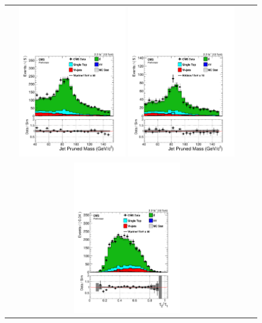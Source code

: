  \begin{figure}[htbp]
 \centering
 \begin{tabular}{cc}
 \includegraphics[width=0.45\textwidth]{chapters/Chapter8-EventSelection/Figures/WVanalysis/ControlPlots_TTbar/mu/jet_mass_pr_0}
 \includegraphics[width=0.45\textwidth]{chapters/Chapter8-EventSelection/Figures/WVanalysis/ControlPlots_TTbar/el/jet_mass_pr_0}\\
 \includegraphics[width=0.45\textwidth]{chapters/Chapter8-EventSelection/Figures/WVanalysis/ControlPlots_TTbar/mu/jet_tau2tau1_0}

\end{tabular}
\end{figure}
